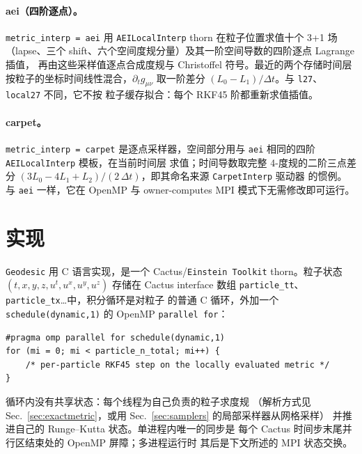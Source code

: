 \documentclass[11pt,UTF8]{ctexart}
\begin{document}
\paragraph{aei（四阶逐点）。}
\texttt{metric\_interp = aei} 用 \texttt{AEILocalInterp}
thorn\citep{aeithornguide} 在粒子位置求值十个 3+1 场（lapse、三个
shift、六个空间度规分量）及其一阶空间导数的四阶逐点 Lagrange 插值，
再由这些采样值逐点合成度规与 Christoffel 符号。最近的两个存储时间层
按粒子的坐标时间线性混合，$\partial_t g_{\mu\nu}$ 取一阶差分
$(L_0-L_1)/\Delta t$。与 \texttt{l27}、\texttt{local27} 不同，它不按
粒子缓存拟合：每个 RKF45 阶都重新求值插值。

\paragraph{carpet。}
\texttt{metric\_interp = carpet} 是逐点采样器，空间部分用与
\texttt{aei} 相同的四阶 \texttt{AEILocalInterp} 模板，在当前时间层
求值；时间导数取完整 4-度规的二阶三点差分
$(3L_0-4L_1+L_2)/(2\,\Delta t)$，即其命名来源 \texttt{CarpetInterp}
驱动器\citep{carpethornguide} 的惯例。与 \texttt{aei} 一样，它在
OpenMP 与 owner-computes MPI 模式下无需修改即可运行。

\section{实现}\label{sec:impl}

\texttt{Geodesic} 用 C 语言实现，是一个 Cactus/\texttt{Einstein Toolkit}
thorn。粒子状态
$(t,x,y,z,u^t,u^x,u^y,u^z)$ 存储在 Cactus interface 数组
\texttt{particle\_tt}、\texttt{particle\_tx}\ldots 中，积分循环是对粒子
的普通 C 循环，外加一个 \texttt{schedule(dynamic,1)} 的 OpenMP
\texttt{parallel for}：
\begin{verbatim}
#pragma omp parallel for schedule(dynamic,1)
for (mi = 0; mi < particle_n_total; mi++) {
    /* per-particle RKF45 step on the locally evaluated metric */
}
\end{verbatim}
循环内没有共享状态：每个线程为自己负责的粒子求度规
（解析方式见 Sec.~\ref{sec:exactmetric}，或用
Sec.~\ref{sec:samplers} 的局部采样器从网格采样）
并推进自己的 Runge--Kutta 状态。单进程内唯一的同步是
每个 Cactus 时间步末尾并行区结束处的 OpenMP 屏障；多进程运行时
其后是下文所述的 MPI 状态交换。
\end{document}
